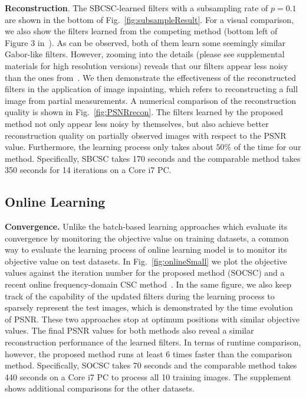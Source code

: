 {\bfseries Reconstruction}. The SBCSC-learned filters with a
subsampling rate of $p=0.1$ are shown in the bottom of
Fig.~\ref{fig:subsampleResult}. For a visual comparison, we also show
the filters learned from the competing method (bottom left of Figure 3
in~\cite{heide2015fast}). As can be observed, both of them learn some
seemingly similar Gabor-like filters. However, zooming into the
details (please see supplemental materials for high resolution
versions) reveals that our filters appear less noisy than the ones
from~\cite{heide2015fast}. We then demonstrate the effectiveness of
the reconstructed filters in the application of image inpainting,
which refers to reconstructing a full image from partial
measurements. A numerical comparison of the reconstruction quality is
shown in Fig.~\ref{fig:PSNRrecon}. The filters learned by the proposed
method not only appear less noisy by themselves, but also achieve
better reconstruction quality on partially observed images with
respect to the PSNR value. Furthermore, the learning process
only takes about $50\%$ of the time for our method. Specifically, SBCSC takes 170 seconds and the comparable method takes 350 seconds for 14 iterations on a Core i7 PC.

\subsection{Online Learning}

{\bfseries Convergence.} Unlike the batch-based learning approaches
which evaluate its convergence by monitoring the objective value on
training datasets, a common way to evaluate the learning process of
online learning model is to monitor its objective value on test
datasets. In Fig.~\ref{fig:onlineSmall} we plot the objective values
against the iteration number for the proposed method (SOCSC) and a
recent online frequency-domain CSC method~\cite{liu-2018-first}. In
the same figure, we also keep track of the capability of the updated
filters during the learning process to sparsely represent the test
images, which is demonstrated by the time evolution of PSNR. These two
approaches stop at optimum positions with similar objective values.
The final PSNR values for both methods also reveal a similar
reconstruction performance of the learned filters. In terms of runtime
comparison, however, the proposed method runs at least $6$ times faster
than the comparison method. Specifically, SOCSC takes 70 seconds and the comparable method takes 440 seconds on a Core i7 PC to process all 10 training images. The supplement shows additional comparisons for the other datasets.

